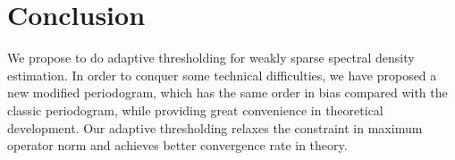 \section*{Conclusion}
We propose to do adaptive thresholding for weakly sparse spectral density estimation. In order to conquer some technical difficulties, we have proposed a new modified periodogram, which has the same order in bias compared with the classic periodogram, while providing great convenience in theoretical development. Our adaptive thresholding relaxes the constraint in maximum operator norm  and achieves better convergence rate in theory. 
